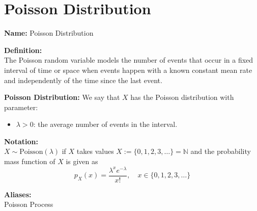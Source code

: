 \documentclass{article}
\begin{document}
\section*{Poisson Distribution}

\textbf{Name:} Poisson Distribution

\textbf{Definition:} \\
The Poisson random variable models the number of events that occur in a fixed interval of time or space when events happen with a known constant mean rate and independently of the time since the last event.

\textbf{Poisson Distribution:} We say that \( X \) has the Poisson distribution with parameter:
\begin{itemize}
    \item \( \lambda > 0 \): the average number of events in the interval.
\end{itemize}

\textbf{Notation:} \\
\( X \sim \text{Poisson}(\lambda) \) if \( X \) takes values \( X := \{0, 1, 2, 3, \ldots\} = \mathbb{N} \) and the probability mass function of \( X \) is given as
\[
p_X(x) = \frac{\lambda^x e^{-\lambda}}{x!}, \quad x \in \{0, 1, 2, 3, \ldots\}
\]

\textbf{Aliases:} \\
Poisson Process
\end{document}

